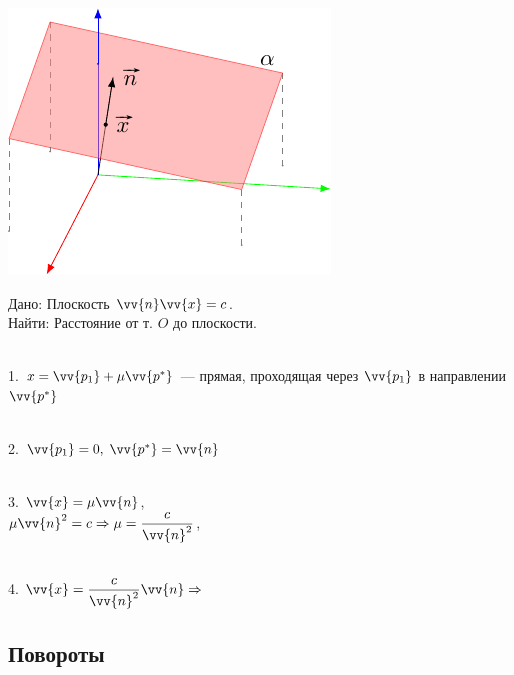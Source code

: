 \documentclass[10pt]{beamer}
\begin{document}
{
	{
		
		\includegraphics{plane4.pdf}
	}
	{

		Дано: Плоскость $\vv{n}\vv{x}=c$. \\
		Найти: Расстояние от т. $O$ до плоскости. \\ ~ \\
		
		\pause
		
		1. $x = \vv{p_1} + \mu\vv{p^*}$ --- прямая, проходящая через $\vv{p_1}$ в направлении $\vv{p^*}$  \\ ~ \\
		
		\pause
		
		2. $\vv{p_1} = 0, \; \vv{p^*} = \vv{n}$   \\ ~ \\
		
		\pause
		
		3. $\vv{x} = \mu\vv{n} $, \\
		 $\displaystyle\mu\vv{n}^2 = c  \Rightarrow \mu = \frac{c}{\vv{n}^2} $, \\ ~ \\
		 
		 \pause
		 
		 4. $\displaystyle\vv{x} = \frac{c}{\vv{n}^2} \vv{n} \Rightarrow $ 
		 
		
	}
}

\subsection{Повороты}
\end{document}

